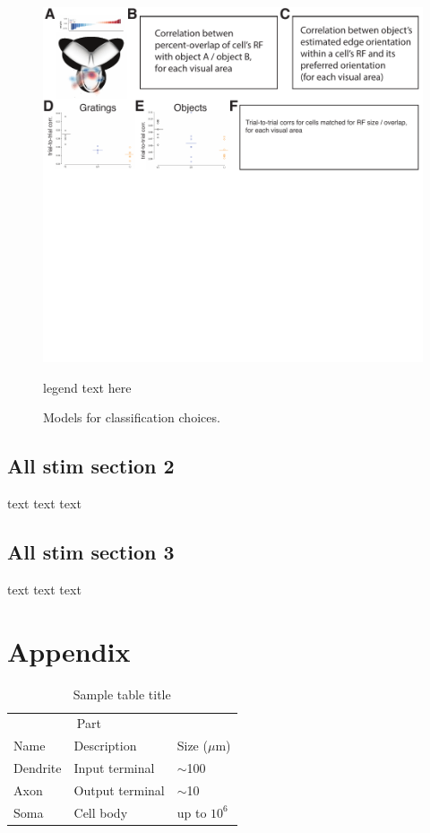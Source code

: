 \documentclass{article}
\begin{document}
\begin{figure}[ht]
  \centering
  \includegraphics[width=\textwidth]{figures/allstim.pdf}
  \caption{Models for classification choices.}
  \medskip
  \small
  legend text here
  \label{fig:fig5}
\end{figure}

\subsection{All stim section 2}
text text text

\subsection{All stim section 3}
text text text



\section{Appendix}

\begin{table}
 \caption{Sample table title}
  \centering
  \begin{tabular}{lll}
    \toprule
    \multicolumn{2}{c}{Part}                   \\
    \cmidrule(r){1-2}
    Name     & Description     & Size ($\mu$m) \\
    \midrule
    Dendrite & Input terminal  & $\sim$100     \\
    Axon     & Output terminal & $\sim$10      \\
    Soma     & Cell body       & up to $10^6$  \\
    \bottomrule
  \end{tabular}
  \label{tab:table}
\end{table}
\end{document}
